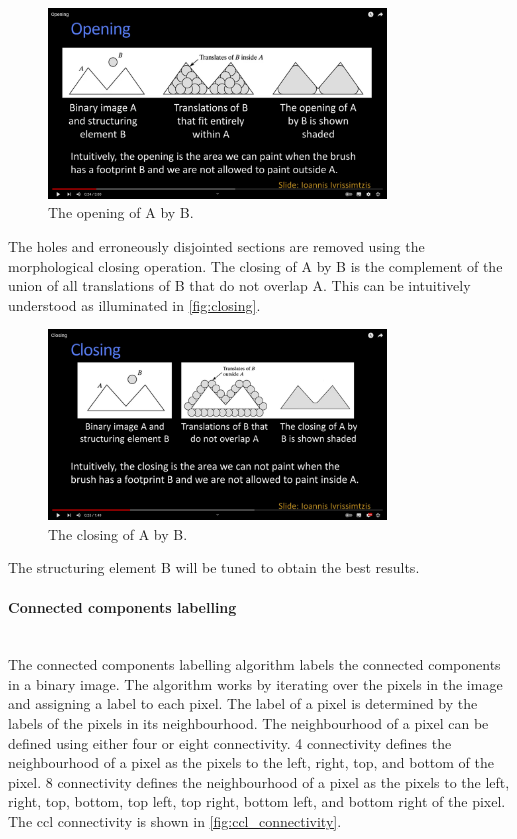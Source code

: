 \begin{figure}[h]
    \centering
    \includegraphics[width=0.8\textwidth]{figures/detection/opening.png}
    \caption{The opening of A by B.}
    \label{fig:opening}
\end{figure}

The holes and erroneously disjointed sections are removed using the morphological closing operation. The closing of A by B is the complement of the union of all translations of B that do not overlap A. This can be intuitively understood as illuminated in \autoref{fig:closing}.

\begin{figure}[h]
    \centering
    \includegraphics[width=0.8\textwidth]{figures/detection/closing.png}
    \caption{The closing of A by B.}
    \label{fig:closing}
\end{figure}

The structuring element B will be tuned to obtain the best results.

\paragraph{Connected components labelling}\mbox{}\\
The connected components labelling algorithm labels the connected components in a binary image. The algorithm works by iterating over the pixels in the image and assigning a label to each pixel. The label of a pixel is determined by the labels of the pixels in its neighbourhood. The neighbourhood of a pixel can be defined using either four or eight connectivity. 4 connectivity defines the neighbourhood of a pixel as the pixels to the left, right, top, and bottom of the pixel. 8 connectivity defines the neighbourhood of a pixel as the pixels to the left, right, top, bottom, top left, top right, bottom left, and bottom right of the pixel. The \gls{ccl} connectivity is shown in \autoref{fig:ccl_connectivity}.

